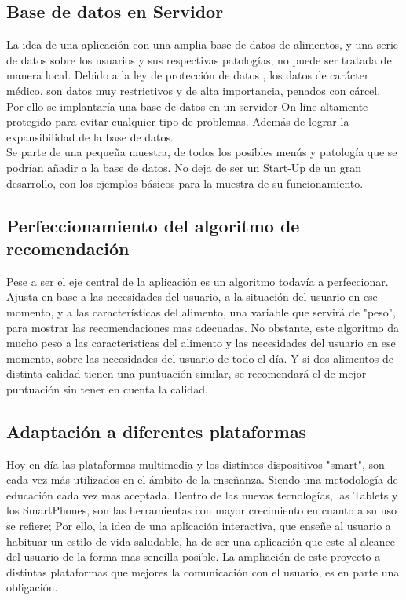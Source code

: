 \subsection{Base de datos en Servidor}
La idea de una aplicación con una amplia  base de datos de alimentos, y una serie de datos sobre los usuarios y sus respectivas patologías, no puede ser tratada de manera local. Debido a la ley de protección de datos \cite{LeyProteccionDatos}, los datos de carácter médico, son datos muy restrictivos y de alta importancia, penados con cárcel.\\
Por ello se implantaría una base de datos en un servidor On-line altamente protegido para evitar cualquier tipo de problemas. Además de lograr la expansibilidad de la base de datos.\\
Se parte de una pequeña muestra, de todos los posibles menús y patología que se podrían añadir a la base de datos. No deja de ser un Start-Up de un gran desarrollo, con los ejemplos básicos para la muestra de su funcionamiento.

\subsection{Perfeccionamiento del algoritmo de recomendación}
Pese a ser el eje central de la aplicación es un algoritmo todavía a perfeccionar. Ajusta en base a las necesidades del usuario, a la situación del usuario en ese momento, y a las características del alimento, una variable que servirá de "peso", para mostrar las recomendaciones mas adecuadas. No obstante, este algoritmo da mucho peso a las caracteristicas del alimento y las necesidades del usuario en ese momento, sobre las necesidades del usuario de todo el día. Y si dos alimentos de distinta calidad tienen una puntuación similar, se recomendará el de mejor puntuación sin tener en cuenta la calidad.

\subsection{Adaptación a diferentes plataformas}
Hoy en día las plataformas multimedia y los distintos dispositivos "smart", son cada vez más utilizados en el ámbito de la enseñanza. Siendo una metodología de educación cada vez mas aceptada. Dentro de las nuevas tecnologías, las Tablets y los SmartPhones, son las herramientas con mayor crecimiento en cuanto a su uso se refiere; Por ello, la idea de una aplicación interactiva, que enseñe al usuario a habituar un estilo de vida saludable, ha de ser una aplicación que este al alcance del usuario de la forma mas sencilla posible. La ampliación de este proyecto a distintas plataformas que mejores la comunicación con el usuario, es en parte una obligación.

